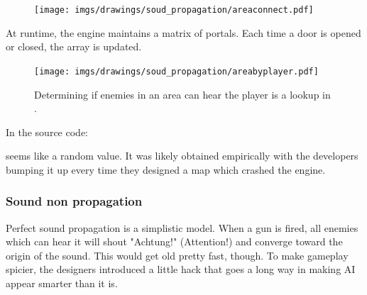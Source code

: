 \begin{figure}[H]
 \centering
 \texttt{[image: imgs/drawings/soud\_propagation/areaconnect.pdf]}
\end{figure}
\par
At runtime, the engine maintains a matrix of portals. Each time a door is opened or closed, the array  is updated. 

\par
\begin{figure}[H]
 \centering
 \texttt{[image: imgs/drawings/soud\_propagation/areabyplayer.pdf]}
 \caption{Determining if enemies in an area can hear the player is a lookup in .}
\end{figure}
\par
In the source code:\\
\par
\begin{minipage}{\textwidth}

\end{minipage}
\par
{} seems like a random value. It was likely obtained empirically with the developers bumping it up every time they designed a map which crashed the engine.\\
\par







\subsubsection{Sound non propagation}
Perfect sound propagation is a simplistic model. When a gun is fired, all enemies which can hear it will shout "Achtung!" (Attention!) and converge toward the origin of the sound. This would get old pretty fast, though. To make gameplay spicier, the designers introduced a little hack that goes a long way in making AI appear smarter than it is.


